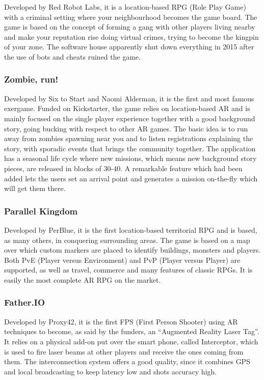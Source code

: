 				Developed by Red Robot Labs, it is a location-based RPG (Role Play Game) with a criminal setting where your neighbourhood becomes the game board. The game is based on the concept of forming a gang with other players living nearby and make your reputation rise doing virtual crimes, trying to become the kingpin of your zone.
				The software house apparently shut down everything in 2015 after the use of bots and cheats ruined the game.
			
			\subsubsection{Zombie, run!}
			
				Developed by Six to Start and Naomi Alderman, it is the first and most famous exergame. Funded on Kickstarter, the game relies on location-based AR and is mainly focused on the single player experience together with a good background story, going bucking with respect to other AR games.
				The basic idea is to run away from zombies spawning near you and to listen registrations explaining the story, with sporadic events that brings the community together.
				The application has a seasonal life cycle where new missions, which means new background story pieces, are released in blocks of 30-40.
				A remarkable feature which had been added lets the users set an arrival point and generates a mission on-the-fly which will get them there.
			
			\subsubsection{Parallel Kingdom}
			
				Developed by PerBlue, it is the first location-based territorial RPG and is based, as many others, in conquering surrounding areas.
				The game is based on a map over which custom markers are placed to identify buildings, monsters and players.
				Both PvE (Player versus Environment) and PvP (Player versus Player) are supported, as well as travel, commerce and many features of classic RPGs.
				It is easily the most complete AR RPG on the market.
			
			\subsubsection{Father.IO}
			
				Developed by Proxy42, it is the first FPS (First Person Shooter) using AR techniques to become, as said by the funders, an “Augmented Reality Laser Tag”.
				It relies on a physical add-on put over the smart phone, called Interceptor, which is used to fire laser beams at other players and receive the ones coming from them.
				The interconnection system offers a good quality, since it combines GPS and local broadcasting to keep latency low and shots accuracy high.
				
